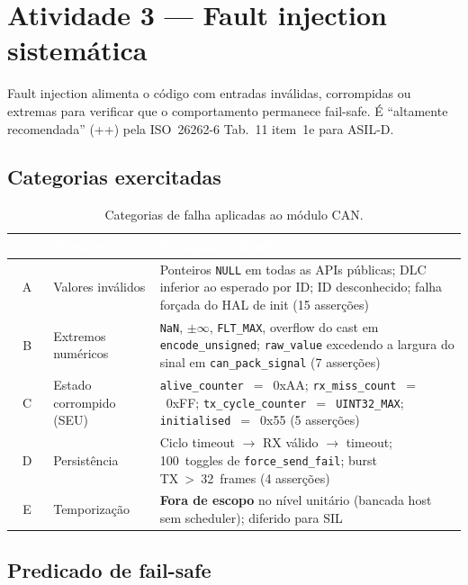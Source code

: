 \documentclass[12pt]{article}
\begin{document}
\section{Atividade 3 --- Fault injection sistemática}
\label{sec:fault}

Fault injection alimenta o código com entradas inválidas, corrompidas ou extremas para verificar que o
comportamento permanece fail-safe. É ``altamente recomendada'' (++) pela ISO~26262-6 Tab.~11 item~1e
para ASIL-D.

\subsection{Categorias exercitadas}

\begin{table}[H]
\centering
\caption{Categorias de falha aplicadas ao módulo CAN.}
\footnotesize
\setlength{\tabcolsep}{4pt}
\begin{tabularx}{\textwidth}{|c|>{\raggedright\arraybackslash}p{3.5cm}
                              |>{\raggedright\arraybackslash}X|}
\hline
\rowcolor{sectionblue}
\textcolor{white}{\textbf{Cat.}} &
\textcolor{white}{\textbf{Natureza}} &
\textcolor{white}{\textbf{Exemplos aplicados}} \\ \hline
A & Valores inválidos  & Ponteiros \texttt{NULL} em todas as APIs públicas; DLC inferior ao esperado por ID; ID desconhecido; falha forçada do HAL de init (15 asserções) \\ \hline
B & Extremos numéricos & \texttt{NaN}, $\pm\infty$, \texttt{FLT\_MAX}, overflow do cast em \texttt{encode\_unsigned}; \texttt{raw\_value} excedendo a largura do sinal em \texttt{can\_pack\_signal} (7 asserções) \\ \hline
C & Estado corrompido (SEU) & \texttt{alive\_counter}~$=$~0xAA; \texttt{rx\_miss\_count}~$=$~0xFF; \texttt{tx\_cycle\_counter}~$=$~\texttt{UINT32\_MAX}; \texttt{initialised}~$=$~0x55 (5 asserções) \\ \hline
D & Persistência       & Ciclo timeout $\rightarrow$ RX válido $\rightarrow$ timeout; 100~toggles de \texttt{force\_send\_fail}; burst TX~>~32~frames (4 asserções) \\ \hline
E & Temporização       & \textbf{Fora de escopo} no nível unitário (bancada host sem scheduler); diferido para SIL \\ \hline
\end{tabularx}
\end{table}

\subsection{Predicado de fail-safe}
\end{document}

